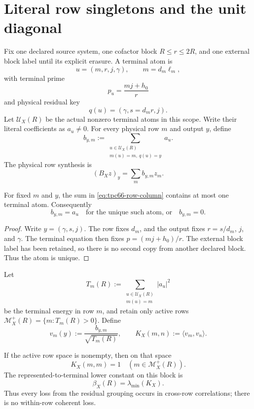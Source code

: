 \section{Literal row singletons and the unit diagonal}

Fix one declared source system, one cofactor block \(R\le r\le2R\), and one
external block label until its explicit erasure. A terminal atom is
\[
 u=(m,r,j,\gamma),\qquad m=d_m\ell_m,
\]
with terminal prime
\[
 p_u=\frac{mj+h_0}{r}
\]
and physical residual key
\begin{equation}\label{eq:tpc66-output-key}
 q(u)=(\gamma,s=d_mr,j).
\end{equation}
Let \(\mathcal U_X(R)\) be the actual nonzero terminal atoms in this scope.
Write their literal coefficients as \(a_u\ne0\). For every physical row \(m\)
and output \(y\), define
\begin{equation}\label{eq:tpc66-row-column}
 b_{y,m}:=\sum_{\substack{u\in\mathcal U_X(R)\\m(u)=m,\ q(u)=y}}a_u.
\end{equation}
The physical row synthesis is
\[
 (B_Xz)_y=\sum_m b_{y,m}z_m.
\]

\begin{lemma}\label{lem:tpc66-row-singleton}
For fixed \(m\) and \(y\), the sum in \eqref{eq:tpc66-row-column} contains at
most one terminal atom. Consequently
\begin{equation}\label{eq:tpc66-singleton-column}
 b_{y,m}=a_u\quad\text{for the unique such atom, or}\quad b_{y,m}=0.
\end{equation}
\end{lemma}

\begin{proof}
Write \(y=(\gamma,s,j)\). The row fixes \(d_m\), and the output fixes
\(r=s/d_m\), \(j\), and \(\gamma\). The terminal equation then fixes
\(p=(mj+h_0)/r\). The external block label has been retained, so there is no
second copy from another declared block. Thus the atom is unique.
\end{proof}

Let
\[
 T_m(R):=\sum_{\substack{u\in\mathcal U_X(R)\\m(u)=m}}|a_u|^2
\]
be the terminal energy in row \(m\), and retain only active rows
\(\mathcal M_X^+(R)=\{m:T_m(R)>0\}\). Define
\[
 v_m(y):=\frac{b_{y,m}}{\sqrt{T_m(R)}},\qquad
 K_X(m,n):=\langle v_m,v_n\rangle.
\]

\begin{theorem}
\label{thm:tpc66-unit-diagonal}
If the active row space is nonempty, then on that space
\begin{equation}\label{eq:tpc66-unit-diagonal}
 \boxed{\qquad K_X(m,m)=1\quad(m\in\mathcal M_X^+(R)).\qquad}
\end{equation}
The represented-to-terminal lower constant on this block is
\begin{equation}\label{eq:tpc66-beta}
 \beta_X(R)=\lambda_{\min}(K_X).
\end{equation}
Thus every loss from the residual grouping occurs in cross-row correlations;
there is no within-row coherent loss.
\end{theorem}

